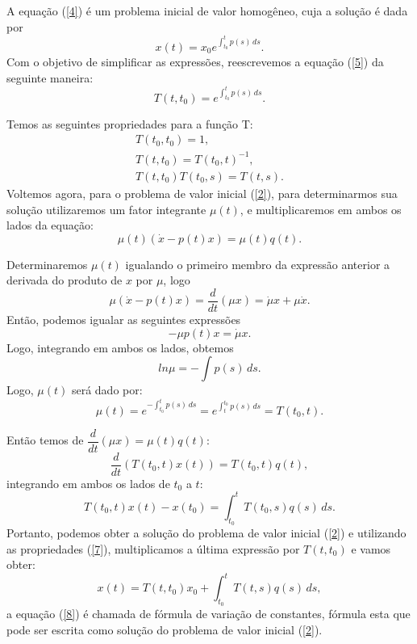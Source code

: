 \documentclass[blue]{beamer}
\numberwithin{equation}{section}
\begin{document}
\begin{frame}
	\justifying
A equação (\ref{4}) é um problema inicial de valor homogêneo, cuja a solução é dada por
\begin{equation} \label{5}
x(t)=x_{0}e^{\int_{t_{0}}^{t} p(s)\,ds}.
\end{equation}
Com o objetivo de simplificar as expressões, reescrevemos a equação (\ref{5}) da seguinte maneira:
\begin{equation} \label{6}
T(t,t_{0})=e^{\int_{t_{0}}^{t} p(s)\,ds}.
\end{equation}

Temos as seguintes propriedades para a função T:
\begin{equation} \label{7}
\begin{array}{lcl}
T(t_{0},t_{0})= 1, \\
T(t,t_{0}) = T(t_{0},t)^{-1}, \\
T(t,t_{0})T(t_{0},s)=T(t,s).
\end{array}
\end{equation}
\hspace{0.2cm} Voltemos agora, para o problema de valor inicial (\ref{2}), para determinarmos sua solução utilizaremos um fator integrante $\mu(t)$, e multiplicaremos em ambos os lados da equação:
$$\mu(t)(\dot{x}-p(t)x)=\mu(t)q(t).$$
	
\end{frame}

\begin{frame}
	\justifying
Determinaremos $\mu(t)$ igualando o primeiro membro da expressão anterior a derivada do produto de $x$ por $\mu$, logo
$$\mu(\dot{x}-p(t)x) = \dfrac{d}{dt} (\mu x) = \dot{\mu}x + \mu\dot{x}.$$
Então, podemos igualar as seguintes expressões
$$-\mu p(t)x = \dot{\mu}x.$$
Logo, integrando em ambos os lados, obtemos
$$ln \mu = - \int p(s) \, ds.$$
\hspace{0.2cm} Logo, $\mu (t)$ será dado por:
$$\mu (t) = e^{- \int_{t_{0}}^{t} p(s) \, ds} = e^{\int_{t}^{t_{0}} p(s) \, ds} = T(t_{0},t).$$
	
\end{frame}

\begin{frame}
	\justifying
	Então temos de $\dfrac{d}{dt} (\mu x) = \mu(t)q(t)$:
	$$\dfrac{d}{dt}(T(t_{0},t) x(t)) = T(t_{0},t)q(t),$$
	integrando em ambos os lados de $t_{0}$ a $t$:
	$$T(t_{0},t)x(t)-x(t_{0}) = \int_{t_{0}}^{t} T(t_{0},s)q(s) \, ds.$$
	\hspace{0.2cm} Portanto, podemos obter a solução do problema de valor inicial (\ref{2}) e utilizando as propriedades (\ref{7}), multiplicamos a última expressão por $T(t,t_{0})$ e vamos obter:
	\begin{equation} \label{8}
	x(t) = T(t,t_{0})x_{0} + \int_{t_{0}}^{t} T(t,s)q(s) \, ds,
	\end{equation}
	a equação (\ref{8}) é chamada de fórmula de variação de constantes, fórmula esta que pode ser escrita como solução do problema de valor inicial (\ref{2}).
	
	
\end{frame}
\end{document}
